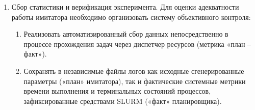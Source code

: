 \begin{enumerate}
    \item Сбор статистики и верификация эксперимента. Для оценки адекватности работы имитатора необходимо организовать систему объективного контроля:
    \begin{enumerate}
        \item Реализовать автоматизированный сбор данных непосредственно в процессе прохождения задач через диспетчер ресурсов (метрика «план -- факт»).
        \item Сохранять в независимые файлы логов как исходные сгенерированные параметры («план» имитатора), так и фактические системные метрики времени выполнения и терминальных состояний процессов, зафиксированные средствами SLURM («факт» планировщика).
    \end{enumerate}
\end{enumerate}


